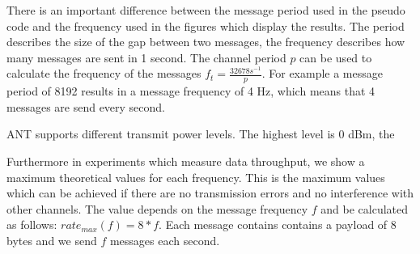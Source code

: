 There is an important difference between the message period used in the pseudo code and the frequency used in the figures which display the results. The period describes the size of the gap between two messages, the frequency describes how many messages are sent in 1 second. The channel period $p$ can be used to calculate the frequency of the messages $f_t = \frac{32678s^{-1}}{p}$. For example a message period of 8192 results in a message frequency of 4 Hz, which means that 4 messages are send every second.

ANT supports different transmit power levels. The highest level is 0 dBm, the 

Furthermore in experiments which measure data throughput, we show a maximum theoretical values for each frequency. This is the maximum values which can be achieved if there are no transmission errors and no interference with other channels. The value depends on the message frequency $f$ and be calculated as follows: $rate_{max}(f) = 8*f$. Each message contains contains a payload of 8 bytes and we send $f$ messages each second.
\newpage

